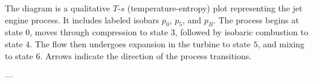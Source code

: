 The diagram is a qualitative \( T \)-\( s \) (temperature-entropy) plot representing the jet engine process. It includes labeled isobars \( p_0 \), \( p_5 \), and \( p_B \). The process begins at state \( 0 \), moves through compression to state \( 3 \), followed by isobaric combustion to state \( 4 \). The flow then undergoes expansion in the turbine to state \( 5 \), and mixing to state \( 6 \). Arrows indicate the direction of the process transitions.

---